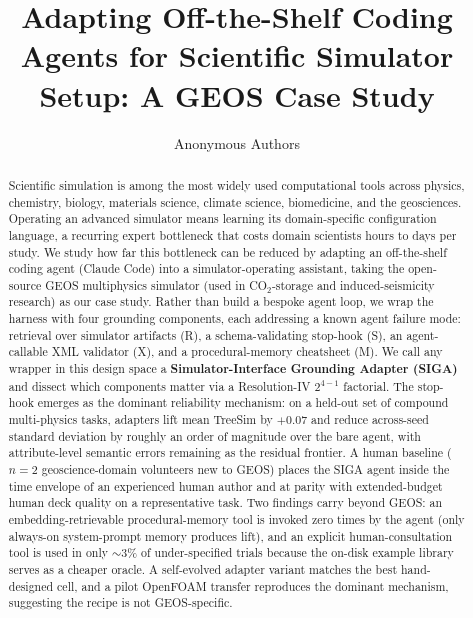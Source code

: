 \documentclass{article}
\title{Adapting Off-the-Shelf Coding Agents for Scientific Simulator Setup: A GEOS Case Study}
\author{%
  Anonymous Authors\\
}
\begin{document}
\maketitle


\begin{abstract}
Scientific simulation is among the most widely used computational tools across physics, chemistry, biology, materials science, climate science, biomedicine, and the geosciences. Operating an advanced simulator means learning its domain-specific configuration language, a recurring expert bottleneck that costs domain scientists hours to days per study. We study how far this bottleneck can be reduced by adapting an off-the-shelf coding agent (Claude Code) into a simulator-operating assistant, taking the open-source GEOS multiphysics simulator (used in CO$_2$-storage and induced-seismicity research) as our case study. Rather than build a bespoke agent loop, we wrap the harness with four grounding components, each addressing a known agent failure mode: retrieval over simulator artifacts (R), a schema-validating stop-hook (S), an agent-callable XML validator (X), and a procedural-memory cheatsheet (M). We call any wrapper in this design space a \textbf{Simulator-Interface Grounding Adapter (SIGA)} and dissect which components matter via a Resolution-IV $2^{4-1}$ factorial. The stop-hook emerges as the dominant reliability mechanism: on a held-out set of compound multi-physics tasks, adapters lift mean TreeSim by $+0.07$ and reduce across-seed standard deviation by roughly an order of magnitude over the bare agent, with attribute-level semantic errors remaining as the residual frontier. A human baseline ($n=2$ geoscience-domain volunteers new to GEOS) places the SIGA agent inside the time envelope of an experienced human author and at parity with extended-budget human deck quality on a representative task. Two findings carry beyond GEOS: an embedding-retrievable procedural-memory tool is invoked zero times by the agent (only always-on system-prompt memory produces lift), and an explicit human-consultation tool is used in only ${\sim}3\%$ of under-specified trials because the on-disk example library serves as a cheaper oracle. A self-evolved adapter variant matches the best hand-designed cell, and a pilot OpenFOAM transfer reproduces the dominant mechanism, suggesting the recipe is not GEOS-specific.
\end{abstract}
\end{document}
